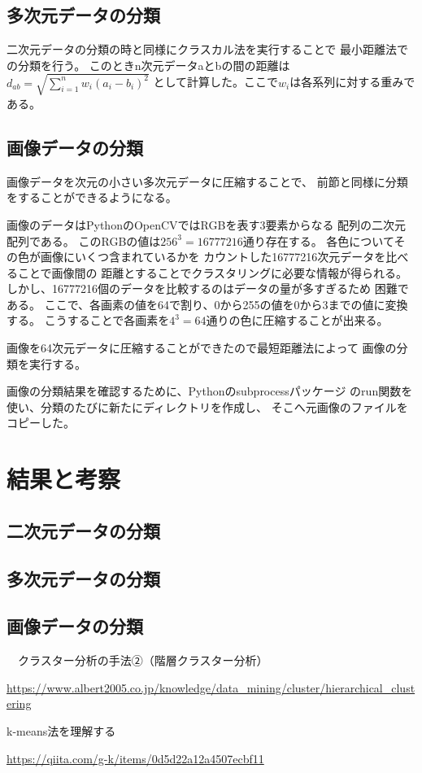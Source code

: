 \documentclass[dvipdfmx]{jsarticle}
\begin{document}
\subsection{多次元データの分類}

二次元データの分類の時と同様にクラスカル法を実行することで
最小距離法での分類を行う。
このときn次元データaとbの間の距離は
$\displaystyle d_{ab} = \sqrt{ \sum_{i=1}^{n}w_i(a_i - b_i)^2 }$
として計算した。ここで$w_i$は各系列に対する重みである。

\subsection{画像データの分類}

画像データを次元の小さい多次元データに圧縮することで、
前節と同様に分類をすることができるようになる。

画像のデータはPythonのOpenCVではRGBを表す3要素からなる
配列の二次元配列である。
このRGBの値は$256^3=16777216$通り存在する。
各色についてその色が画像にいくつ含まれているかを
カウントした16777216次元データを比べることで画像間の
距離とすることでクラスタリングに必要な情報が得られる。
しかし、16777216個のデータを比較するのはデータの量が多すぎるため
困難である。
ここで、各画素の値を64で割り、0から255の値を0から3までの値に変換する。
こうすることで各画素を$4^3=64$通りの色に圧縮することが出来る。

画像を64次元データに圧縮することができたので最短距離法によって
画像の分類を実行する。

画像の分類結果を確認するために、Pythonのsubprocessパッケージ
のrun関数を使い、分類のたびに新たにディレクトリを作成し、
そこへ元画像のファイルをコピーした。

\section{結果と考察}

\subsection{二次元データの分類}



\subsection{多次元データの分類}



\subsection{画像データの分類}



\begin{thebibliography}{10}
  　クラスター分析の手法②（階層クラスター分析）

  \url{https://www.albert2005.co.jp/knowledge/data_mining/cluster/hierarchical_clustering}

   k-means法を理解する

  \url{https://qiita.com/g-k/items/0d5d22a12a4507ecbf11}
\end{thebibliography}
\end{document}
